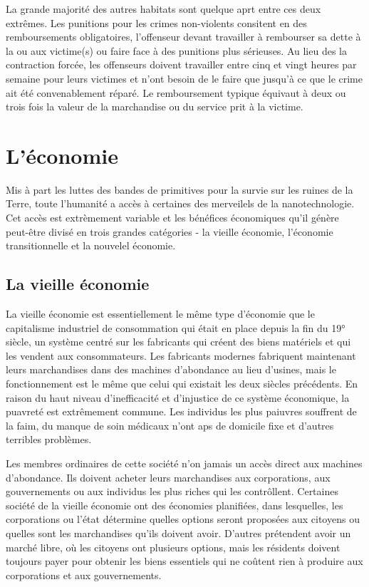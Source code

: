               La grande majorité des autres habitats sont quelque aprt entre ces deux extrêmes. Les punitions pour les crimes non-violents consitent en des remboursements obligatoires, l'offenseur devant travailler à rembourser sa dette à la ou aux victime(s) ou faire face à des punitions plus sérieuses. Au lieu des la contraction forcée, les offenseurs doivent travailler entre cinq et vingt heures par semaine pour leurs victimes et n'ont besoin de le faire que jusqu'à ce que le crime ait été convenablement réparé. Le remboursement typique équivaut à deux ou trois fois la valeur de la marchandise ou du service prit à la victime. 

               \section{L'économie} \label{sec:economy} 

               Mis à part les luttes des bandes de primitives pour la survie sur les ruines de la Terre, toute l'humanité a accès à certaines des merveilels de la nanotechnologie. Cet accès est extrèmement variable et les bénéfices économiques qu'il génère peut-être divisé en trois grandes catégories - la vieille économie, l'économie transitionnelle et la nouvelel économie. 

               \subsection{La vieille économie} \label{sec:old-economy} 

               La vieille économie est essentiellement le même type d'économie que le capitalisme industriel de consommation qui était en place depuis la fin du 19° siècle, un système centré sur les fabricants qui créent des biens matériels et qui les vendent aux consommateurs. Les fabricants modernes fabriquent maintenant leurs marchandises dans des machines d'abondance au lieu d'usines, mais le fonctionnement est le même que celui qui existait les deux siècles précédents. En raison du haut niveau d'inefficacité et d'injustice de ce système économique, la puavreté est extrêmement commune. Les individus les plus paiuvres souffrent de la faim, du manque de soin médicaux n'ont aps de domicile fixe et d'autres terribles problèmes. 

               Les membres ordinaires de cette société n'on jamais un accès direct aux machines d'abondance. Ils doivent acheter leurs marchandises aux corporations, aux gouvernements ou aux individus les plus riches qui les contrôllent. Certaines société de la vieille économie ont des économies planifiées, dans lesquelles, les corporations ou l'état détermine quelles options seront proposées aux citoyens ou quelles sont les marchandises qu'ils doivent avoir. D'autres prétendent avoir un marché libre, où les citoyens ont plusieurs options, mais les résidents doivent toujours payer pour obtenir les biens essentiels qui ne coûtent rien à produire aux corporations et aux gouvernements. 

